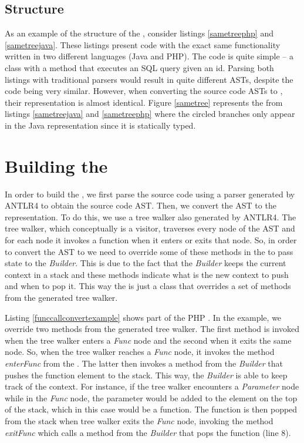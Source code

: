 \subsection{Structure}
As an example of the structure of the \astname{}, consider listings \ref{sametreephp} and \ref{sametreejava}. These listings present code with the exact same functionality written in two different languages (Java and PHP). The code is quite simple -- a class with a method that executes an SQL query given an id. 
Parsing both listings with traditional parsers would result in quite different ASTs, despite the code being very similar. However, when converting the source code ASTs to \astname{}, their representation is almost identical. Figure \ref{sametree} represents the \astname{} from listings \ref{sametreejava} and \ref{sametreephp} where the circled branches only appear in the Java representation since it is statically typed.




\section{Building the \astname{}}
\label{buildgenericast}

In order to build the \astname{}, we first parse the source code using a parser generated by ANTLR4 to obtain the source code AST. Then, we convert the AST to the \astname{} representation. To do this, we use a tree walker also generated by ANTLR4. The tree walker, which conceptually is a visitor, traverses every node of the AST and for each node it invokes a function when it enters or exits that node. So, in order to convert the AST to \astname{} we need to override some of these methods in the \converter{} to pass state to the \textit{\astname{} Builder}. This is due to the fact that the \textit{\astname{} Builder} keeps the current context in a stack and these methods indicate what is the new context to push and when to pop it. This way the \converter{} is just a class that overrides a set of methods from the generated tree walker. 

Listing \ref{funccallconvertexample} shows part of the PHP \converter{}. In the example, we override two methods from the generated tree walker. The first method is invoked when the tree walker enters a \textit{Func} node and the second when it exits the same node. So, when the tree walker reaches a \textit{Func} node, it invokes the method \textit{enterFunc} from the \converter{}. The latter then invokes a method from the \textit{\astname{} Builder} that pushes the function element to the stack. This way, the \textit{\astname{} Builder} is able to keep track of the context. For instance, if the tree walker encounters a \textit{Parameter} node while in the \textit{Func} node, the parameter would be added to the element on the top of the stack, which in this case would be a function. The function is then popped from the stack when tree walker exits the \textit{Func} node, invoking the method \textit{exitFunc} which calls a method from the \textit{\astname{} Builder} that pops the function (line 8). 

